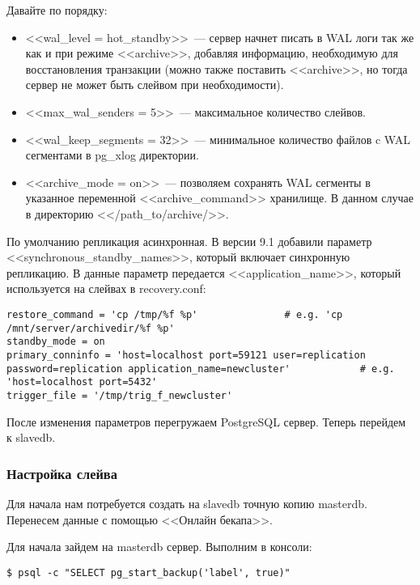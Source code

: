 Давайте по порядку:
\begin{itemize}
\item <<wal\_level = hot\_standby>>~--- сервер начнет писать в WAL логи так же как и при режиме <<archive>>,
добавляя информацию, необходимую для восстановления транзакции (можно также поставить <<archive>>,
но тогда сервер не может быть слейвом при необходимости).
\item <<max\_wal\_senders = 5>>~--- максимальное количество слейвов.
\item <<wal\_keep\_segments = 32>>~--- минимальное количество файлов c WAL сегментами в pg\_xlog директории.
\item <<archive\_mode = on>>~--- позволяем сохранять WAL сегменты в указанное переменной <<archive\_command>> хранилище.
В данном случае в директорию <</path\_to/archive/>>.
\end{itemize}

По умолчанию репликация асинхронная. В версии 9.1 добавили параметр <<synchronous\_standby\_names>>, который включает синхронную репликацию. В данные параметр передается <<application\_name>>, который используется на слейвах в recovery.conf:

\begin{lstlisting}[label=lst:streaming91,caption=recovery.conf для синхронной репликации на слейве]
restore_command = 'cp /tmp/%f %p'               # e.g. 'cp /mnt/server/archivedir/%f %p'
standby_mode = on
primary_conninfo = 'host=localhost port=59121 user=replication password=replication application_name=newcluster'            # e.g. 'host=localhost port=5432'
trigger_file = '/tmp/trig_f_newcluster'
\end{lstlisting}


После изменения параметров перегружаем PostgreSQL сервер. Теперь перейдем к slavedb.

\subsubsection{Настройка слейва}
Для начала нам потребуется создать на slavedb точную копию masterdb. Перенесем данные с помощью <<Онлайн бекапа>>.

Для начала зайдем на masterdb сервер. Выполним в консоли:
\begin{lstlisting}[label=lst:streaming10,caption=Выполняем на мастере]
$ psql -c "SELECT pg_start_backup('label', true)"
\end{lstlisting}

